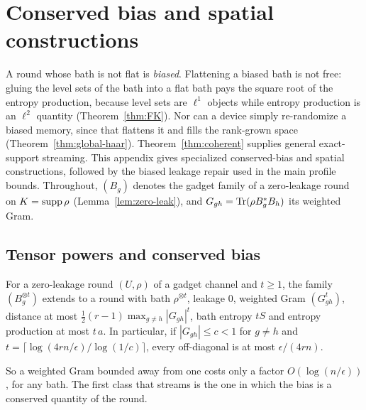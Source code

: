 \section{Conserved bias and spatial constructions}\label{sec:biased}

A round whose bath is not flat is \emph{biased}. Flattening a biased bath is not free: gluing the level sets of the bath into a flat bath
pays the square root of the entropy production, because level sets are $\ell^1$ objects while entropy production is an $\ell^2$ quantity
(Theorem~\ref{thm:FK}). Nor can a device simply re-randomize a biased memory, since that flattens it and fills the rank-grown space
(Theorem~\ref{thm:global-haar}). Theorem~\ref{thm:coherent} supplies general exact-support streaming. This appendix gives specialized
conserved-bias and spatial constructions, followed by the biased leakage repair used in the main profile bounds.
Throughout, $(B_g)$ denotes the gadget family of a zero-leakage round on $K=\operatorname{supp}\rho$ (Lemma~\ref{lem:zero-leak}), and
$G_{gh}=\operatorname{Tr}(\rho B_g^*B_h)$ its weighted Gram.

\subsection{Tensor powers and conserved bias}

\begin{lemma}\label{lem:tensor}
For a zero-leakage round $(U,\rho)$ of a gadget channel and $t\ge1$, the family $(B_g^{\otimes t})$ extends to a round with bath $\rho^{\otimes t}$,
leakage $0$, weighted Gram $(G_{gh}^t)$, distance at most $\frac12(r-1)\max_{g\ne h}|G_{gh}|^t$, bath entropy $tS$ and entropy production at most
$t\,a$. In particular, if $|G_{gh}|\le c<1$ for $g\ne h$ and $t=\lceil\log(4rn/\epsilon)/\log(1/c)\rceil$, every off-diagonal is at most $\epsilon/(4rn)$.
\end{lemma}

So a weighted Gram bounded away from one costs only a factor $O(\log(n/\epsilon))$, for any bath. The first class that streams is the one in
which the bias is a conserved quantity of the round.

